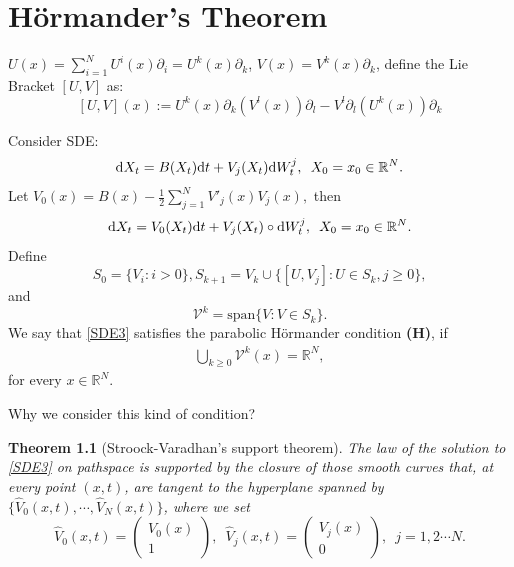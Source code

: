 \documentclass[twoside, 12pt]{book}
\numberwithin{equation}{chapter}
\newtheorem{theorem}{Theorem}[section]
\def\mR{{\mathbb R}}
\def\sV{{\mathscr V}}
\def\geq{\geqslant}
\def\p{\partial}
\def\d{\text{\rm{d}}}
\begin{document}
	\chapter{H\"ormander's Theorem}\label{chapt:hormander}
	
	$U(x)=\sum_{i=1}^N U^i(x)\p_i=U^k(x)\partial_k$, $V(x)=V^k(x)\p_k$, define the Lie Bracket  $[U, V]$ as: 
	$$[U,V](x):= U^k(x) \p_k(V^l(x))\p_l-V^l\p_l(U^k(x))\p_k$$
	
	Consider SDE: 
	\begin{align}\label{SDE2}
		\d X_t =B(X_t)\d t+V_j (X_t) \d W^j_t, \,\,\, X_0=x_0\in \mR^N. 
	\end{align}
	Let $V_0(x)=B(x)-\frac{1}{2} \sum_{j=1}^N V'_j(x)V_j(x), $ then
	\begin{align}\label{SDE3}
		\d X_t =V_0(X_t)\d t+V_j (X_t)\circ \d W^j_t, \,\,\, X_0=x_0\in \mR^N. 
	\end{align}
	Define 
	$$S_0=\{V_i : i>0\}, S_{k+1}=V_k\cup \{[U,V_j]: U\in S_k, j\geq 0\}, $$
	and 
	$$\sV^k=\mbox{span} \{V: V\in S_k\}. $$
	We say that \eqref{SDE3} satisfies the parabolic H\"ormander condition 
	\textbf{(H)}, if    \begin{align}\label{H}\bigcup_{k\geq 0} \sV^k(x) = \mR^N, \end{align} for every $x \in \mR^N.$ 
	
	Why we consider this kind of condition? 
	
	\begin{theorem}[Stroock-Varadhan's support theorem]
		The law of the solution to \eqref{SDE3} on pathspace is supported by the closure of those smooth curves that, at every point $(x, t)$, are tangent to the hyperplane spanned by $\{\hat{V}_0(x,t), \cdots , \hat{V}_N(x,t)\}$, where we set 
		$$\hat{V}_0(x,t)=\begin{pmatrix} V_0(x)\\ 1 \end{pmatrix},  \,\,\, \hat{V}_j(x,t)=\begin{pmatrix} V_j(x)\\ 0 \end{pmatrix}, \,\,\, j=1,2\cdots N. $$
	\end{theorem}
	
	
	
\end{document}
